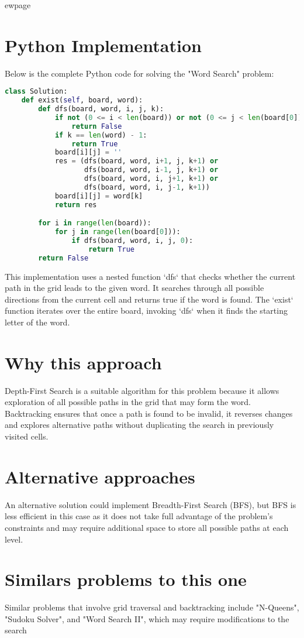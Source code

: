 ewpage %

\section*{Python Implementation}
Below is the complete Python code for solving the "Word Search" problem:

\begin{fullwidth}
\begin{lstlisting}[language=Python]
class Solution:
    def exist(self, board, word):
        def dfs(board, word, i, j, k):
            if not (0 <= i < len(board)) or not (0 <= j < len(board[0])) or board[i][j] != word[k]:
                return False
            if k == len(word) - 1:
                return True
            board[i][j] = ''
            res = (dfs(board, word, i+1, j, k+1) or
                   dfs(board, word, i-1, j, k+1) or
                   dfs(board, word, i, j+1, k+1) or
                   dfs(board, word, i, j-1, k+1))
            board[i][j] = word[k]
            return res

        for i in range(len(board)):
            for j in range(len(board[0])):
                if dfs(board, word, i, j, 0):
                    return True
        return False
\end{lstlisting}

\end{fullwidth}

This implementation uses a nested function `dfs` that checks whether the current path in the grid leads to the given word. It searches through all possible directions from the current cell and returns true if the word is found. The `exist` function iterates over the entire board, invoking `dfs` when it finds the starting letter of the word.

\section*{Why this approach}
Depth-First Search is a suitable algorithm for this problem because it allows exploration of all possible paths in the grid that may form the word. Backtracking ensures that once a path is found to be invalid, it reverses changes and explores alternative paths without duplicating the search in previously visited cells.

\section*{Alternative approaches}
An alternative solution could implement Breadth-First Search (BFS), but BFS is less efficient in this case as it does not take full advantage of the problem's constraints and may require additional space to store all possible paths at each level.

\section*{Similars problems to this one}
Similar problems that involve grid traversal and backtracking include "N-Queens", "Sudoku Solver", and "Word Search II", which may require modifications to the search